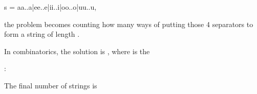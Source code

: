 \documentclass[letterpaper,12pt,english]{book}
\begin{document}
\begin{sphinxVerbatim}[commandchars=\\\{\}]
s = \PYGZdq{}aa..a|ee..e|ii..i|oo..o|uu..u\PYGZdq{},
\end{sphinxVerbatim}

\sphinxAtStartPar
the problem becomes counting how many ways of putting those 4 separators \sphinxcode{\sphinxupquote{\textquotesingle{}|\textquotesingle{}}} to form a string of length .

\sphinxAtStartPar
In combinatorics, the solution is , where  is the %
\begin{footnote}[113]\sphinxAtStartFootnote
{}
%
\end{footnote}:

\sphinxAtStartPar
{}

\sphinxAtStartPar
The final number of strings is

\sphinxAtStartPar
{}
\end{document}
